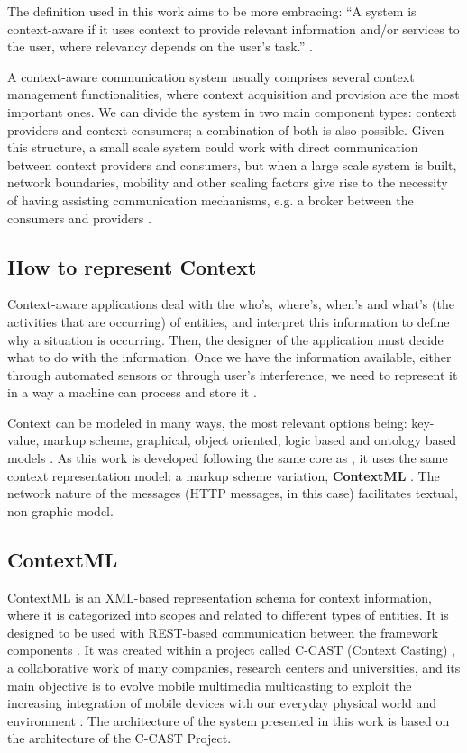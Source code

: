 The definition used in this work aims to be more embracing: ``A system is context-aware if it uses context to provide relevant information and/or services to the user, where relevancy depends on the user's task.'' \cite{dey2000providing}.

A context-aware communication system usually comprises several context management functionalities, where context acquisition and provision are the most important ones. We can divide the system in two main component types: context providers and context consumers; a combination of both is also possible. Given this structure, a small scale system could work with direct communication between context providers and consumers, but when a large scale system is built, network boundaries, mobility and other scaling factors give rise to the necessity of having assisting communication mechanisms, e.g. a broker between the consumers and providers \cite{kian2010federated}.

\subsection{How to represent Context}
Context-aware applications deal with the who's, where's, when's and what's (the activities that are occurring) of entities, and interpret this information to define why a situation is occurring. Then, the designer of the application must decide what to do with the information. Once we have the information available, either through automated sensors or through user's interference, we need to represent it in a way a machine can process and store it \cite{dey2000providing}.

Context can be modeled in many ways, the most relevant options being: key-value, markup scheme, graphical, object oriented, logic based and ontology based models \cite{baldauf2007survey}. As this work is developed following the same core as \cite{crippa2010}, it uses the same context representation model: a markup scheme variation, \textbf{ContextML} \cite{knappmeyer2010contextml}. The network nature of the messages (HTTP messages, in this case) facilitates textual, non graphic model. 

\subsection{ContextML}

ContextML is an XML-based representation schema for context information, where it is categorized into scopes and related to different types of entities. It is designed to be used with REST-based communication between the framework components \cite{knappmeyer2010contextml}. It was created within a project called C-CAST (Context Casting) \cite{ccast}, a collaborative work of many companies, research centers and universities, and its main objective is to evolve mobile multimedia multicasting to exploit the increasing integration of mobile devices with our everyday physical world and environment \cite{crippa2010}. The architecture of the system presented in this work is based on the architecture of the C-CAST Project.

